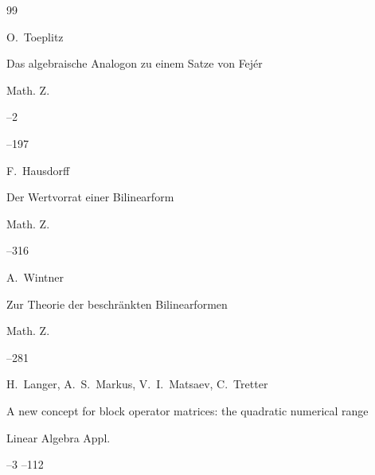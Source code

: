 \begin{thebibliography}{99}




\by O.~Toeplitz

\paper Das algebraische Analogon zu einem Satze von Fej\'er 

\jour Math. Z. 



--2 

--197





\by F.~Hausdorff

\paper Der Wertvorrat einer Bilinearform 

\jour Math. Z. 




--316







\by A.~Wintner

\paper Zur Theorie der beschr\"ankten Bilinearformen 

\jour Math. Z. 




--281





\by H.~Langer, A.~S.~Markus, V.~I.~Matsaev, C.~Tretter

\paper A new concept for block operator matrices: the quadratic numerical range 

\jour Linear Algebra Appl. 


 --3 --112






\end{thebibliography}
